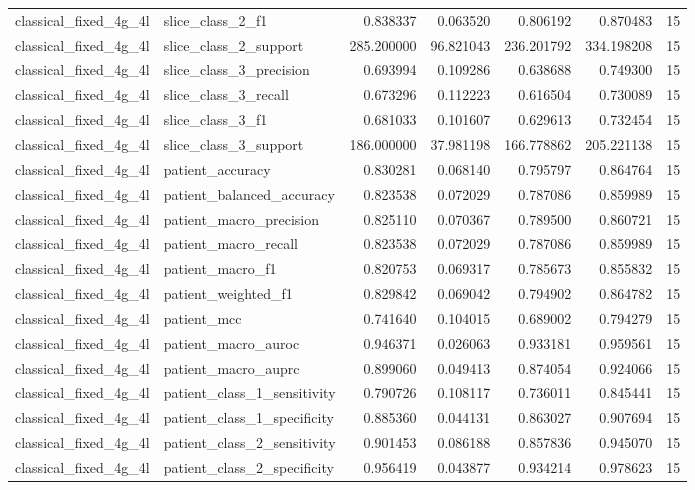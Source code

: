 \begin{tabular}{llrrrrr}
classical_fixed_4g_4l & slice_class_2_f1 & 0.838337 & 0.063520 & 0.806192 & 0.870483 & 15 \\
classical_fixed_4g_4l & slice_class_2_support & 285.200000 & 96.821043 & 236.201792 & 334.198208 & 15 \\
classical_fixed_4g_4l & slice_class_3_precision & 0.693994 & 0.109286 & 0.638688 & 0.749300 & 15 \\
classical_fixed_4g_4l & slice_class_3_recall & 0.673296 & 0.112223 & 0.616504 & 0.730089 & 15 \\
classical_fixed_4g_4l & slice_class_3_f1 & 0.681033 & 0.101607 & 0.629613 & 0.732454 & 15 \\
classical_fixed_4g_4l & slice_class_3_support & 186.000000 & 37.981198 & 166.778862 & 205.221138 & 15 \\
classical_fixed_4g_4l & patient_accuracy & 0.830281 & 0.068140 & 0.795797 & 0.864764 & 15 \\
classical_fixed_4g_4l & patient_balanced_accuracy & 0.823538 & 0.072029 & 0.787086 & 0.859989 & 15 \\
classical_fixed_4g_4l & patient_macro_precision & 0.825110 & 0.070367 & 0.789500 & 0.860721 & 15 \\
classical_fixed_4g_4l & patient_macro_recall & 0.823538 & 0.072029 & 0.787086 & 0.859989 & 15 \\
classical_fixed_4g_4l & patient_macro_f1 & 0.820753 & 0.069317 & 0.785673 & 0.855832 & 15 \\
classical_fixed_4g_4l & patient_weighted_f1 & 0.829842 & 0.069042 & 0.794902 & 0.864782 & 15 \\
classical_fixed_4g_4l & patient_mcc & 0.741640 & 0.104015 & 0.689002 & 0.794279 & 15 \\
classical_fixed_4g_4l & patient_macro_auroc & 0.946371 & 0.026063 & 0.933181 & 0.959561 & 15 \\
classical_fixed_4g_4l & patient_macro_auprc & 0.899060 & 0.049413 & 0.874054 & 0.924066 & 15 \\
classical_fixed_4g_4l & patient_class_1_sensitivity & 0.790726 & 0.108117 & 0.736011 & 0.845441 & 15 \\
classical_fixed_4g_4l & patient_class_1_specificity & 0.885360 & 0.044131 & 0.863027 & 0.907694 & 15 \\
classical_fixed_4g_4l & patient_class_2_sensitivity & 0.901453 & 0.086188 & 0.857836 & 0.945070 & 15 \\
classical_fixed_4g_4l & patient_class_2_specificity & 0.956419 & 0.043877 & 0.934214 & 0.978623 & 15 \\

\end{tabular}
